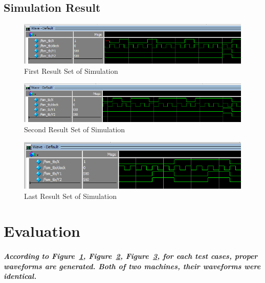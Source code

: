 \documentclass{report}
\begin{document}
        \section{Simulation Result}
            \begin{figure}[!htb]
                \centering
                \includegraphics[width=\textwidth]{diagrams/waveform-first.png}
                \caption {First Result Set of Simulation}
                \label{fig:wf-1}
            \end{figure}

            \begin{figure}[!htb]
                \centering
                \includegraphics[width=\textwidth]{diagrams/waveform-second.png}
                \caption {Second Result Set of Simulation}
                \label{fig:wf-2}
            \end{figure}

            \begin{figure}[!htb]
                \centering
                \includegraphics[width=\textwidth]{diagrams/waveform-last.png}
                \caption {Last Result Set of Simulation}
                \label{fig:wf-3}
            \end{figure}

    \chapter{Evaluation}
        \paragraph{\normalfont According to Figure~\ref{fig:wf-1}, Figure~\ref{fig:wf-2}, Figure~\ref{fig:wf-3}, for each test cases, proper waveforms are generated. Both of two machines, their waveforms were identical.}  
\end{document}
